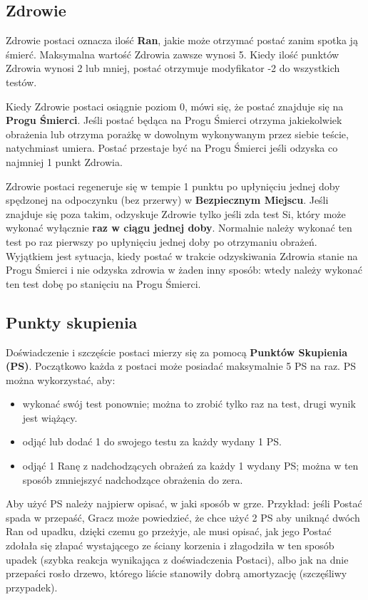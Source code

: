 \documentclass[10pt,a4paper]{book}
\begin{document}
\begin{multicols}{2}
\subsection*{Zdrowie}
Zdrowie postaci oznacza ilość \textbf{Ran}, jakie może otrzymać postać zanim spotka ją śmierć. Maksymalna wartość Zdrowia zawsze wynosi 5. Kiedy ilość punktów Zdrowia wynosi 2 lub mniej, postać otrzymuje modyfikator -2 do wszystkich testów.

Kiedy Zdrowie postaci osiągnie poziom 0, mówi się, że postać znajduje się na \textbf{Progu Śmierci}. Jeśli postać będąca na Progu Śmierci otrzyma jakiekolwiek obrażenia lub otrzyma porażkę w dowolnym wykonywanym przez siebie teście, natychmiast umiera. Postać przestaje być na Progu Śmierci jeśli odzyska co najmniej 1 punkt Zdrowia.

Zdrowie postaci regeneruje się w tempie 1 punktu po upłynięciu jednej doby spędzonej na odpoczynku (bez przerwy) w \textbf{Bezpiecznym Miejscu}. Jeśli znajduje się poza takim, odzyskuje Zdrowie tylko jeśli zda test Si, który może wykonać wyłącznie \textbf{raz w ciągu jednej doby}. Normalnie należy wykonać ten test po raz pierwszy po upłynięciu jednej doby po otrzymaniu obrażeń. Wyjątkiem jest sytuacja, kiedy postać w trakcie odzyskiwania Zdrowia stanie na Progu Śmierci i nie odzyska zdrowia w żaden inny sposób: wtedy należy wykonać ten test dobę po stanięciu na Progu Śmierci.


\subsection*{Punkty skupienia}
Doświadczenie i szczęście postaci mierzy się za pomocą \textbf{Punktów Skupienia (PS)}. Początkowo każda z postaci może posiadać maksymalnie 5 PS na raz. PS można wykorzystać, aby:
\begin{itemize}
	\item wykonać swój test ponownie; można to zrobić tylko raz na test, drugi wynik jest wiążący.
	\item odjąć lub dodać 1 do swojego testu za każdy wydany 1 PS.
	\item odjąć 1 Ranę z nadchodzących obrażeń za każdy 1 wydany PS; można w ten sposób zmniejszyć nadchodzące obrażenia do zera.
\end{itemize}
	
Aby użyć PS należy najpierw opisać, w jaki sposób w grze. Przykład: jeśli Postać spada w przepaść, Gracz może powiedzieć, że chce użyć 2 PS aby uniknąć dwóch Ran od upadku, dzięki czemu go przeżyje, ale musi opisać, jak jego Postać zdołała się złapać wystającego ze ściany korzenia i złagodziła w ten sposób upadek (szybka reakcja wynikająca z doświadczenia Postaci), albo jak na dnie przepaści rosło drzewo, którego liście stanowiły dobrą amortyzację (szczęśliwy przypadek).


\end{multicols}
\end{document}
